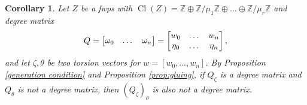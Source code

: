 \documentclass{amsart}
\DeclareMathOperator{\Cl}{Cl}
\newcommand{\Z}{\mathbb{Z}}
\newtheorem{corollary}[lem]{Corollary}
\theoremstyle{definition}
\begin{document}
\begin{corollary}\label{cor:incomp_row}
    Let $Z$ be a fwps with $\Cl(Z)=\Z\oplus\Z/\mu_1\Z\oplus\dots\oplus\Z/\mu_r\Z$ and degree matrix $$Q=\begin{bmatrix}
        \omega_0 & \dots & \omega_n
    \end{bmatrix}=\begin{bmatrix}
        w_0 & \dots & w_n\\
        \eta_{0} & \dots & \eta_{n}
    \end{bmatrix},\\[4pt]$$ and let $\zeta,\theta$ be two torsion vectors for $w=[w_0,\dots,w_n]$. By Proposition \ref{generation condition} and Proposition \ref{prop:gluing}, if $Q_\zeta$ is a degree matrix and $Q_\theta$ is not a degree matrix, then $(Q_\zeta)_\theta$ is also not a degree matrix.
\end{corollary}
\end{document}
